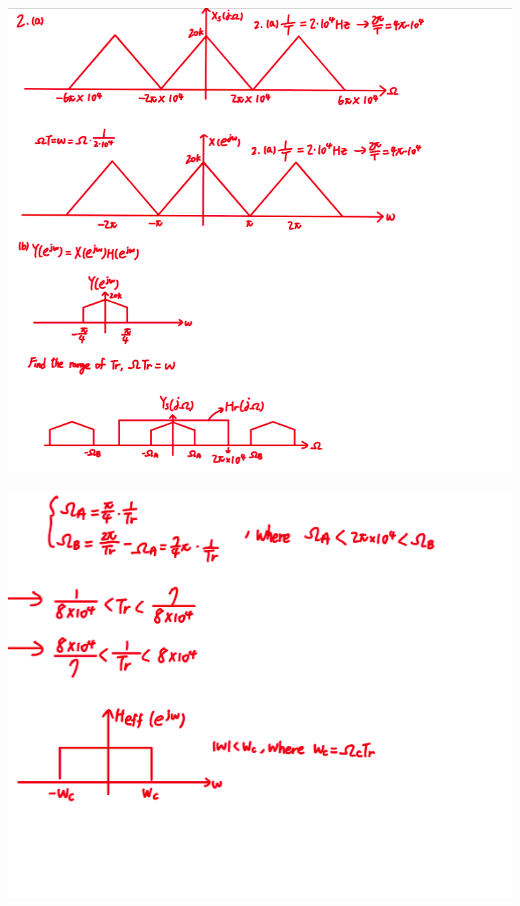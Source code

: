 \documentclass[a4paper]{article}
\begin{document}
	\begin{center}
		\includegraphics[width=1\linewidth]{screenshot069}
	\end{center}
	
	\begin{center}
		\includegraphics[width=1\linewidth]{screenshot070}
	\end{center}
	
\end{document}
